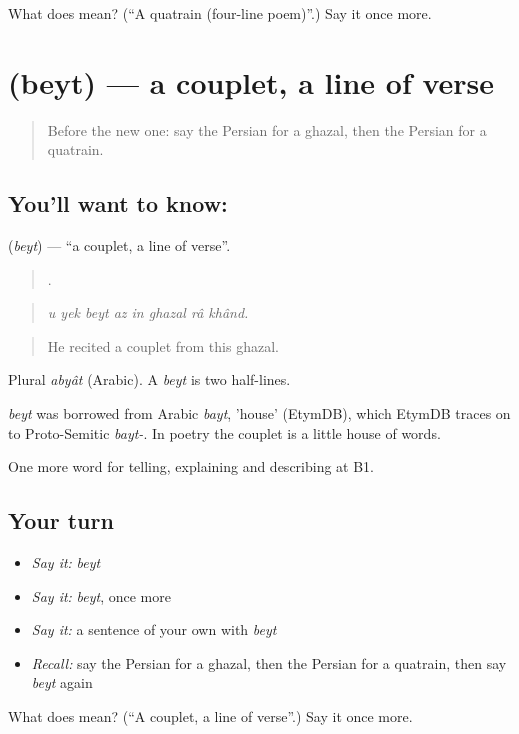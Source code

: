 \begin{tcolorbox}[breakable,colback=teal!4,colframe=teal!35!black,title={Before you move on}]
What does  mean? (\textquotedblleft{}A quatrain (four-line poem)\textquotedblright{}.) Say it once more.
\end{tcolorbox}
\section[\texorpdfstring{\fa{بیت} (beyt)}{بیت (beyt)}]{ (beyt) — a couplet, a line of verse}

\label{lesson:FA-C521-beyt}



\begin{quote}
Before the new one: say the Persian for a ghazal, then the Persian for a quatrain.
\end{quote}

\subsection*{You'll want to know: }
\textbf{} (\emph{beyt}) — \textquotedblleft{}a couplet, a line of verse\textquotedblright{}.

\begin{quote}
       .
\end{quote}

\begin{quote}
\emph{u yek beyt az in ghazal râ khând.}
\end{quote}

\begin{quote}
He recited a couplet from this ghazal.
\end{quote}

Plural \emph{abyât} (Arabic). A \emph{beyt} is two half-lines.

\begin{cousinweb}
\emph{beyt} was borrowed from Arabic \emph{bayt}, 'house' (EtymDB), which EtymDB traces on to Proto-Semitic \emph{bayt-}. In poetry the couplet is a little house of words.
\end{cousinweb}

\begin{grammarlens}[title={What you've built}]
One more word for telling, explaining and describing at B1.
\end{grammarlens}

\subsection*{Your turn}
\begin{itemize}
\raggedright
  \item \emph{Say it:} \emph{beyt}
  \item \emph{Say it:} \emph{beyt}, once more
  \item \emph{Say it:} a sentence of your own with \emph{beyt}
  \item \emph{Recall:} say the Persian for a ghazal, then the Persian for a quatrain, then say \emph{beyt} again
\end{itemize}

\begin{tcolorbox}[breakable,colback=teal!4,colframe=teal!35!black,title={Before you move on}]
What does  mean? (\textquotedblleft{}A couplet, a line of verse\textquotedblright{}.) Say it once more.
\end{tcolorbox}
